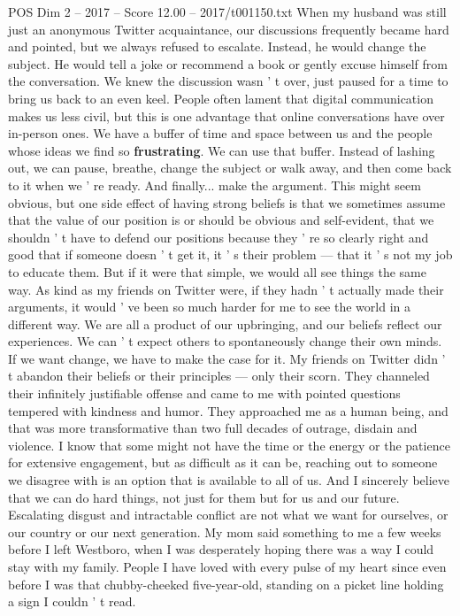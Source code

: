 \begin{textsample}{POS Dim 2 – 2017 – Score 12.00 – 2017/t001150.txt}
When my husband was still just an anonymous Twitter acquaintance, our discussions frequently became hard and pointed, but we always refused to escalate.
Instead, he would change the subject.
He would tell a joke or recommend a book or gently excuse himself from the conversation.
We knew the discussion wasn ' t over, just paused for a time to bring us back to an even keel.
People often lament that digital communication makes us less civil, but this is one advantage that online conversations have over in-person ones.
We have a buffer of time and space between us and the people whose ideas we find so \textbf{frustrating}.
We can use that buffer.
Instead of lashing out, we can pause, breathe, change the subject or walk away, and then come back to it when we ' re ready.
And finally... make the argument.
This might seem obvious, but one side effect of having strong beliefs is that we sometimes assume that the value of our position is or should be obvious and self-evident, that we shouldn ' t have to defend our positions because they ' re so clearly right and good that if someone doesn ' t get it, it ' s their problem — that it ' s not my job to educate them.
But if it were that simple, we would all see things the same way.
As kind as my friends on Twitter were, if they hadn ' t actually made their arguments, it would ' ve been so much harder for me to see the world in a different way.
We are all a product of our upbringing, and our beliefs reflect our experiences.
We can ' t expect others to spontaneously change their own minds.
If we want change, we have to make the case for it.
My friends on Twitter didn ' t abandon their beliefs or their principles — only their scorn.
They channeled their infinitely justifiable offense and came to me with pointed questions tempered with kindness and humor.
They approached me as a human being, and that was more transformative than two full decades of outrage, disdain and violence.
I know that some might not have the time or the energy or the patience for extensive engagement, but as difficult as it can be, reaching out to someone we disagree with is an option that is available to all of us.
And I sincerely believe that we can do hard things, not just for them but for us and our future.
Escalating disgust and intractable conflict are not what we want for ourselves, or our country or our next generation.
My mom said something to me a few weeks before I left Westboro, when I was desperately hoping there was a way I could stay with my family.
People I have loved with every pulse of my heart since even before I was that chubby-cheeked five-year-old, standing on a picket line holding a sign I couldn ' t read.

\end{textsample}
